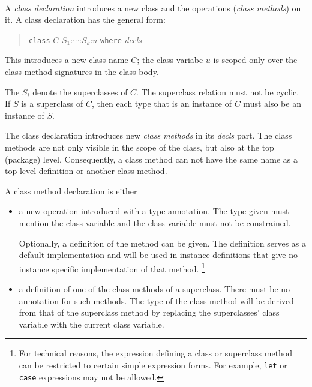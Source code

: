 \begin{flushleft}
    \\
  \sym{:} 
  \alt {}
\end{flushleft}

A \emph{class declaration} introduces a new class and the operations (\emph{class methods}) on it. A class declaration has the general form:

\begin{quote}
\texttt{class} $C$ \hspace{0.2cm} $S_1$:$\cdots$:$S_k$:$u$ \hspace{0.2cm} \texttt{where} \hspace{0.2cm} \emph{decls}
\end{quote}

This introduces a new class name $C$; the class variabe $u$ is scoped only over the class method signatures in the class body.

The $S_i$ denote the superclasses of $C$.
The superclass relation must not be cyclic. If $S$ is a superclass of $C$, then each type that is an instance of $C$ must also be an instance of $S$.

The class declaration introduces new \emph{class methods} in its \emph{decls} part.
The class methods are not only visible in the scope of the class, but also at the top (package) level.
Consequently, a class method can not have the same name as a top level definition or another class method.

A class method declaration is either

\begin{itemize}
\item a new operation introduced with a \hyperref[annotation]{type annotation}. The type given must mention the class variable and the class variable must not be constrained.

Optionally, a definition of the method can be given. The definition serves as a default implementation and will be used in instance definitions that give no instance specific implementation of that method.
\footnote{
For technical reasons, the expression defining a class or superclass method can be restricted to certain simple expression forms. For example, \texttt{let} or \texttt{case} expressions may not be allowed.
}
\item a definition of one of the class methods of a superclass. There must be no annotation for such methods. The type of the class method will be derived from that of the superclass method by replacing the superclasses' class variable with the current class variable.
\end{itemize}

